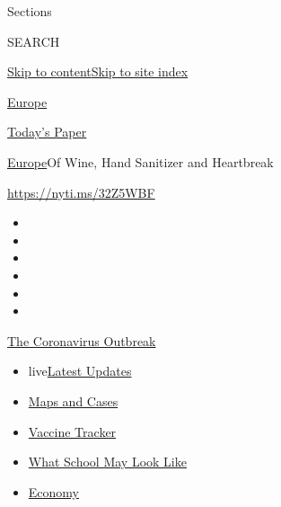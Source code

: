 Sections

SEARCH

\protect\hyperlink{site-content}{Skip to
content}\protect\hyperlink{site-index}{Skip to site index}

\href{https://www.nytimes3xbfgragh.onion/section/world/europe}{Europe}

\href{https://myaccount.nytimes3xbfgragh.onion/auth/login?response_type=cookie\&client_id=vi}{}

\href{https://www.nytimes3xbfgragh.onion/section/todayspaper}{Today's
Paper}

\href{/section/world/europe}{Europe}\textbar{}Of Wine, Hand Sanitizer
and Heartbreak

\url{https://nyti.ms/32Z5WBF}

\begin{itemize}
\item
\item
\item
\item
\item
\item
\end{itemize}

\href{https://www.nytimes3xbfgragh.onion/news-event/coronavirus?action=click\&pgtype=Article\&state=default\&region=TOP_BANNER\&context=storylines_menu}{The
Coronavirus Outbreak}

\begin{itemize}
\tightlist
\item
  live\href{https://www.nytimes3xbfgragh.onion/2020/08/01/world/coronavirus-covid-19.html?action=click\&pgtype=Article\&state=default\&region=TOP_BANNER\&context=storylines_menu}{Latest
  Updates}
\item
  \href{https://www.nytimes3xbfgragh.onion/interactive/2020/us/coronavirus-us-cases.html?action=click\&pgtype=Article\&state=default\&region=TOP_BANNER\&context=storylines_menu}{Maps
  and Cases}
\item
  \href{https://www.nytimes3xbfgragh.onion/interactive/2020/science/coronavirus-vaccine-tracker.html?action=click\&pgtype=Article\&state=default\&region=TOP_BANNER\&context=storylines_menu}{Vaccine
  Tracker}
\item
  \href{https://www.nytimes3xbfgragh.onion/interactive/2020/07/29/us/schools-reopening-coronavirus.html?action=click\&pgtype=Article\&state=default\&region=TOP_BANNER\&context=storylines_menu}{What
  School May Look Like}
\item
  \href{https://www.nytimes3xbfgragh.onion/live/2020/07/31/business/stock-market-today-coronavirus?action=click\&pgtype=Article\&state=default\&region=TOP_BANNER\&context=storylines_menu}{Economy}
\end{itemize}

